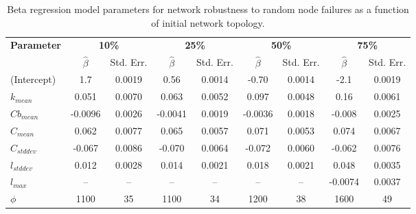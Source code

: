 \begin{table}[!htp]
\scriptsize
\centering

\begin{tabular}{lcccccccc}
\toprule
\multirow{2}{*}{\textbf{Parameter}} & \multicolumn{2}{c}{\textbf{10\%}} & \multicolumn{2}{c}{\textbf{25\%}} & \multicolumn{2}{c}{\textbf{50\%}} & \multicolumn{2}{c}{\textbf{75\%}}\\
 & $\hat{\beta}$ & Std. Err. & $\hat{\beta}$ & Std. Err. & $\hat{\beta}$ & Std. Err. & $\hat{\beta}$ & Std. Err. \\
\midrule

(Intercept) & 1.7 & 0.0019 & 0.56 & 0.0014 & -0.70 & 0.0014 & -2.1 & 0.0019 \\
$k_{mean}$ & 0.051 & 0.0070 & 0.063 & 0.0052 & 0.097 & 0.0048 & 0.16 & 0.0061 \\
$Cb_{mean}$ & -0.0096 & 0.0026 & -0.0041 & 0.0019 & -0.0036 & 0.0018 & -0.008 & 0.0025 \\
$C_{mean}$ & 0.062 & 0.0077 & 0.065 & 0.0057 & 0.071 & 0.0053 & 0.074 & 0.0067 \\
$C_{std dev}$ & -0.067 & 0.0086 & -0.070 & 0.0064 & -0.072 & 0.0060 & -0.062 & 0.0076 \\
$l_{std dev}$ & 0.012 & 0.0028 & 0.014 & 0.0021 & 0.018 & 0.0021 & 0.048 & 0.0035 \\
$l_{max}$ & -- & -- & -- & -- & -- & -- & -0.0074 & 0.0037 \\
$\phi$ & 1100 & 35 & 1100 & 34 & 1200 & 38 & 1600 & 49 \\

\bottomrule

\end{tabular}

\caption[Beta regression model parameters for network robustness to random node failures.]{\label{tab:ch2:betaregNR}Beta regression model parameters for network robustness to random node failures as a function of initial network topology.}
\end{table}



